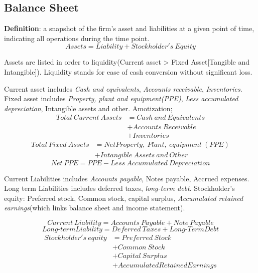 \documentclass[10pt, a4paper]{article}
\begin{document}
        \subsection{Balance Sheet}
            \textbf{Definition}: a snapshot of the firm's asset and liabilities at a given point of time, indicating all operations during the time point. 
            $$Assets = Liability + Stockholder's\ Equity$$

            Assets are listed in order to liquidity(Current asset > Fixed Asset[Tangible and Intangible]). Liquidity stands for ease of cash conversion without significant loss.

            Current asset includes \emph{Cash and equivalents}, \emph{Accounts receivable}, \emph{Inventories}. Fixed asset includes \emph{Property, plant and equipment(PPE)}, \emph{Less accumulated depreciation}, Intangible assets and other. Amotization;
            \begin{align*}
                Total\ Current\ Assets &= Cash\ and\ Equivalents\\
                                       &+ Accounts\ Receivable\\
                                       &+ Inventories  
            \end{align*}
            \begin{align*}
                Total\ Fixed\ Assets &= Net Property,\ Plant,\ equipment\ (PPE) \\
                                     &+ Intangible\ Assets\ and\ Other        
            \end{align*}
            $$Net\ PPE = PPE - Less\ Accumulated\ Depreciation$$

            Current Liabilities includes \emph{Accounts payable}, Notes payable, Accrued expenses. Long term Liabilities includes deferred taxes, \emph{long-term debt}. Stockholder's equity: Preferred stock, Common stock, capital surplus, \emph{Accumulated retained earnings}(which links balance sheet and income statement).
            
            $$Current\ Liability = Accounts\ Payable + Note\ Payable$$
            $$Long\text{-}term Liability = Deferred\ Taxes + Long\text{-}Term Debt$$
            \begin{align*}
                Stockholder's\ equity &= Preferred\ Stock \\
                                      &+ Common\ Stock\\
                                      &+ Capital\ Surplus \\ 
                                      &+ Accumulated Retained Earnings
            \end{align*}
        
\end{document}
